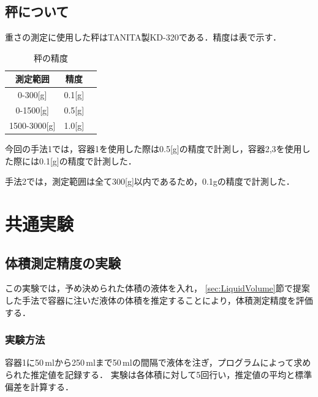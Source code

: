 	\subsection{秤について}
	重さの測定に使用した秤はTANITA製KD-320である．精度は表で示す．
	\begin{table}[h]
		\centering
		\caption{秤の精度}
		\begin{tabular}{@{}ccc@{}}
			\toprule 
			測定範囲 & 精度 \\ 
			\midrule
			0-300[g]&  0.1[g] \\ 
			0-1500[g]& 0.5[g] \\ 
			1500-3000[g]& 1.0[g] \\ 
			\bottomrule 
		\end{tabular} 
		\label{tab:Scaler}
	\end{table}
	
	
	今回の手法1では，容器1を使用した際は0.5[g]の精度で計測し，容器2,3を使用した際には0.1[g]の精度で計測した．
	
	手法2では，測定範囲は全て300[g]以内であるため，0.1gの精度で計測した．	
	
\section{共通実験}
	\subsection{体積測定精度の実験}\label{sec:exp-all}
	この実験では，予め決められた体積の液体を入れ，
	\ref{sec:LiquidVolume}節で提案した手法で容器に注いだ液体の体積を推定することにより，体積測定精度を評価する．
	
		\subsubsection{実験方法}
		容器1に50\,mlから250\,mlまで50\,mlの間隔で液体を注ぎ，プログラムによって求められた推定値を記録する．
		実験は各体積に対して5回行い，推定値の平均と標準偏差を計算する．
		
